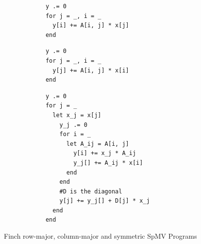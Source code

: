 \begin{figure}
    \begin{minipage}[t]{0.18\textwidth}
        \vspace{0pt} %
        \begin{verbatim}
            y .= 0
            for j = _, i = _
              y[i] += A[i, j] * x[j]
            end
        \end{verbatim}
        \vspace{24pt} %
        \begin{verbatim}
            y .= 0
            for j = _, i = _
              y[j] += A[i, j] * x[i]
            end
        \end{verbatim}
    \end{minipage}\hfill%
    \begin{minipage}[t]{0.22\textwidth}
        \vspace{0pt} %
        \begin{verbatim}
            y .= 0
            for j = _
              let x_j = x[j]
                y_j .= 0
                for i = _
                  let A_ij = A[i, j]
                    y[i] += x_j * A_ij
                    y_j[] += A_ij * x[i]
                  end
                end
                #D is the diagonal
                y[j] += y_j[] + D[j] * x_j
              end
            end
        \end{verbatim}
    \end{minipage}
    \vspace{-8pt}
    \caption{Finch row-major, column-major and symmetric SpMV Programs}
    \label{spmv_programs}
    \vspace{-12pt}
\end{figure}

